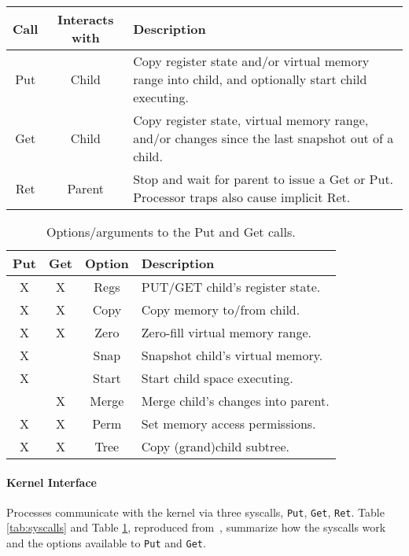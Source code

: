 \begin{center}
\begin{table*}[t]
\centering
\begin{tabular}{c | c | l}
Call & Interacts with & Description \\
\hline
Put & Child & Copy register state and/or virtual memory range into child, and optionally start child executing. \\
Get & Child & Copy register state, virtual memory range, and/or changes since the last snapshot out of a child. \\
Ret & Parent & Stop and wait for parent to issue a Get or Put. Processor traps also cause implicit Ret. \\
\end{tabular}
\caption{System calls comprising Determinator’s kernel API.}
\label{tab:syscalls}
\end{table*}
\end{center}

\begin{center}
\begin{table}[t]
\begin{tabular}{c | c | c | l}
Put & Get & Option & Description \\
\hline
X & X & Regs & PUT/GET child’s register state. \\
X & X & Copy & Copy memory to/from child. \\
X & X & Zero & Zero-fill virtual memory range. \\
X &  & Snap & Snapshot child’s virtual memory. \\
X &  & Start & Start child space executing. \\
 & X & Merge & Merge child’s changes into parent. \\
X & X & Perm & Set memory access permissions. \\
X & X & Tree & Copy (grand)child subtree. \\
\end{tabular}
\caption{Options/arguments to the Put and Get calls.}
\label{tab:options}
\end{table}
\end{center}

\paragraph{Kernel Interface} Processes communicate with the kernel via three
syscalls, {\tt Put}, {\tt Get}, {\tt Ret}. Table \ref{tab:syscalls} and Table
\ref{tab:options}, reproduced from~\cite{Aviram10}, summarize how the syscalls
work and the options available to {\tt Put} and {\tt Get}.

